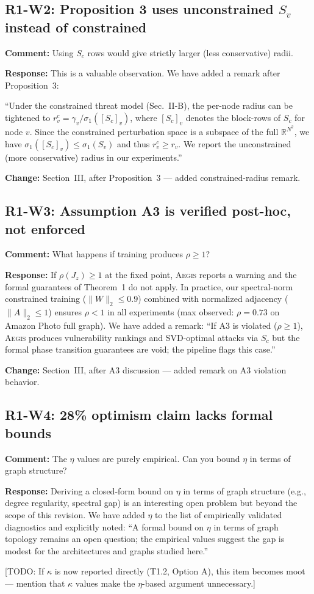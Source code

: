 \documentclass[11pt]{article}
\newcommand{\reviewer}[1]{\subsection*{\textcolor{revcolor}{#1}}}
\newcommand{\comment}[1]{\textcolor{revcolor}{\textbf{Comment:} #1}}
\newcommand{\response}[1]{\textcolor{responsecolor}{\textbf{Response:} #1}}
\newcommand{\change}[1]{\textcolor{changecolor}{\textbf{Change:} #1}}
\newcommand{\AEGIS}{\textsc{Aegis}}
\begin{document}
\reviewer{R1-W2: Proposition 3 uses unconstrained $S_v$ instead of constrained}

\comment{Using $S_c$ rows would give strictly larger (less conservative) radii.}

\response{
This is a valuable observation. We have added a remark after Proposition~3:

``Under the constrained threat model (Sec.~II-B), the per-node radius can be tightened to $r_v^c = \gamma_v / \sigma_1([S_c]_v)$, where $[S_c]_v$ denotes the block-rows of $S_c$ for node $v$. Since the constrained perturbation space is a subspace of the full $\mathbb{R}^{N^2}$, we have $\sigma_1([S_c]_v) \leq \sigma_1(S_v)$ and thus $r_v^c \geq r_v$. We report the unconstrained (more conservative) radius in our experiments.''
}

\change{Section~III, after Proposition~3 --- added constrained-radius remark.}


\reviewer{R1-W3: Assumption A3 is verified post-hoc, not enforced}

\comment{What happens if training produces $\rho \geq 1$?}

\response{
If $\rho(J_z) \geq 1$ at the fixed point, \AEGIS{} reports a warning and the formal guarantees of Theorem~1 do not apply. In practice, our spectral-norm constrained training ($\|W\|_2 \leq 0.9$) combined with normalized adjacency ($\|\hat{A}\|_2 \leq 1$) ensures $\rho < 1$ in all experiments (max observed: $\rho = 0.73$ on Amazon Photo full graph). We have added a remark: ``If A3 is violated ($\rho \geq 1$), \AEGIS{} produces vulnerability rankings and SVD-optimal attacks via $S_c$ but the formal phase transition guarantees are void; the pipeline flags this case.''
}

\change{Section~III, after A3 discussion --- added remark on A3 violation behavior.}


\reviewer{R1-W4: 28\% optimism claim lacks formal bounds}

\comment{The $\eta$ values are purely empirical. Can you bound $\eta$ in terms of graph structure?}

\response{
Deriving a closed-form bound on $\eta$ in terms of graph structure (e.g., degree regularity, spectral gap) is an interesting open problem but beyond the scope of this revision. We have added $\eta$ to the list of empirically validated diagnostics and explicitly noted: ``A formal bound on $\eta$ in terms of graph topology remains an open question; the empirical values suggest the gap is modest for the architectures and graphs studied here.''

[TODO: If $\kappa$ is now reported directly (T1.2, Option A), this item becomes moot --- mention that $\kappa$ values make the $\eta$-based argument unnecessary.]
}
\end{document}
